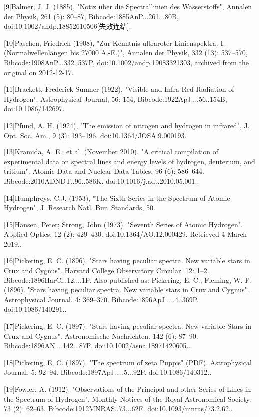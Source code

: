 [9]Balmer, J. J. (1885), "Notiz uber die Spectrallinien des Wasserstoffs", Annalen der Physik, 261 (5): 80–87, Bibcode:1885AnP...261...80B, doi:10.1002/andp.18852610506[失效连结].


[10]Paschen, Friedrich (1908), "Zur Kenntnis ultraroter Linienspektra. I. (Normalwellenlängen bis 27000 Å.-E.)", Annalen der Physik, 332 (13): 537–570, Bibcode:1908AnP...332..537P, doi:10.1002/andp.19083321303, archived from the original on 2012-12-17.


[11]Brackett, Frederick Sumner (1922), "Visible and Infra-Red Radiation of Hydrogen", Astrophysical Journal, 56: 154, Bibcode:1922ApJ....56..154B, doi:10.1086/142697.


[12]Pfund, A. H. (1924), "The emission of nitrogen and hydrogen in infrared", J. Opt. Soc. Am., 9 (3): 193–196, doi:10.1364/JOSA.9.000193.


[13]Kramida, A. E.; et al. (November 2010). "A critical compilation of experimental data on spectral lines and energy levels of hydrogen, deuterium, and tritium". Atomic Data and Nuclear Data Tables. 96 (6): 586–644. Bibcode:2010ADNDT..96..586K. doi:10.1016/j.adt.2010.05.001..


[14]Humphreys, C.J. (1953), "The Sixth Series in the Spectrum of Atomic Hydrogen", J. Research Natl. Bur. Standards, 50.

[15]Hansen, Peter; Strong, John (1973). "Seventh Series of Atomic Hydrogen". Applied Optics. 12 (2): 429–430. doi:10.1364/AO.12.000429. Retrieved 4 March 2019..


[16]Pickering, E. C. (1896). "Stars having peculiar spectra. New variable stars in Crux and Cygnus". Harvard College Observatory Circular. 12: 1–2. Bibcode:1896HarCi..12....1P. Also published as: Pickering, E. C.; Fleming, W. P. (1896). "Stars having peculiar spectra. New variable stars in Crux and Cygnus". Astrophysical Journal. 4: 369–370. Bibcode:1896ApJ.....4..369P. doi:10.1086/140291..

[17]Pickering, E. C. (1897). "Stars having peculiar spectra. New variable Stars in Crux and Cygnus". Astronomische Nachrichten. 142 (6): 87–90. Bibcode:1896AN....142...87P. doi:10.1002/asna.18971420605..

[18]Pickering, E. C. (1897). "The spectrum of zeta Puppis" (PDF). Astrophysical Journal. 5: 92–94. Bibcode:1897ApJ.....5...92P. doi:10.1086/140312..

[19]Fowler, A. (1912). "Observations of the Principal and other Series of Lines in the Spectrum of Hydrogen". Monthly Notices of the Royal Astronomical Society. 73 (2): 62–63. Bibcode:1912MNRAS..73...62F. doi:10.1093/mnras/73.2.62..

